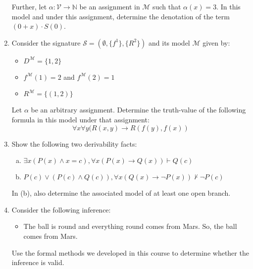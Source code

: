 \begin{enumerate}[\thesubsection.1]
\begin{itemize}
    \end{itemize}
    Further, let $\alpha:\mathcal{V}\to\mathbb{N}$ be an assignment in
    $\mathcal{M}$ such that $\alpha(x)=3$. In this model and under
    this assignment, determine the denotation of the term $(0+x)\cdot S(0)$.

  \item Consider the signature $\mathcal{S}=(\emptyset, \{f^1\},
    \{R^2\})$ and its model $\mathcal{M}$ given by:
    \begin{itemize}

    \item $D^\mathcal{M}=\{1,2\}$
      
    \item $f^\mathcal{M}(1)=2$ and $f^\mathcal{M}(2)=1$

    \item $R^\mathcal{M}=\{(1,2)\}$
      
     \end{itemize}

     Let $\alpha$ be an arbitrary assignment. Determine the
     truth-value of the following formula in this model under that
     assignment: \[\forall x\forall y(R(x,y)\to R(f(y), f(x))\] 

   \item Show the following two derivability facts:
     
     \begin{enumerate}[(a)]

     \item $\exists x(P(x)\land x=c), \forall x(P(x)\to Q(x))\vdash Q(c)$
       
       \item $P(c)\lor (P(c)\land Q(c)), \forall x(Q(x)\to \neg
         P(x))\nvdash \neg P(c)$
         
       \end{enumerate}
      
       In (b), also determine the associated model of at least one
       open branch.


     \item Consider the following inference:
       \begin{itemize}
       \item The ball is round and everything round comes from
         Mars. So, the ball comes from Mars.
       \end{itemize}
       Use the formal methods we developed in this course to determine
       whether the inference is valid.

    
  \end{enumerate}

